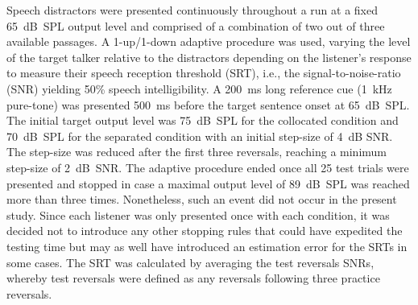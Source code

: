 \documentclass[a4paper, twoside]{templates/ociamthesis}
\begin{document}
Speech distractors were presented continuously throughout a run at a fixed 65~dB~SPL output level and comprised of a combination of two out of three available passages. A 1-up/1-down adaptive procedure was used, varying the level of the target talker relative to the distractors depending on the listener's response to measure their speech reception threshold (SRT), i.e., the signal-to-noise-ratio (SNR) yielding 50\% speech intelligibility. A 200~ms long reference cue (1~kHz pure-tone) was presented 500~ms before the target sentence onset at 65~dB~SPL. The initial target output level was 75~dB~SPL for the collocated condition and 70~dB~SPL for the separated condition with an initial step-size of 4~dB SNR. The step-size was reduced after the first three reversals, reaching a minimum step-size of 2~dB~SNR. The adaptive procedure ended once all 25 test trials were presented and stopped in case a maximal output level of 89~dB~SPL was reached more than three times. Nonetheless, such an event did not occur in the present study. Since each listener was only presented once with each condition, it was decided not to introduce any other stopping rules that could have expedited the testing time but may as well have introduced an estimation error for the SRTs in some cases. The SRT was calculated by averaging the test reversals SNRs, whereby test reversals were defined as any reversals following three practice reversals.\\
\end{document}
